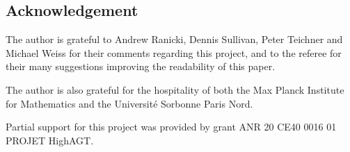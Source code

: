 
\subsection*{Acknowledgement}

The author is grateful to Andrew Ranicki, Dennis Sullivan, Peter Teichner and Michael Weiss for their comments regarding this project, and to the referee for their many suggestions improving the readability of this paper.

The author is also grateful for the hospitality of both the Max Planck Institute for Mathematics and the Universit\'e Sorbonne Paris Nord.

Partial support for this project was provided by grant ANR 20 CE40 0016 01 PROJET HighAGT.